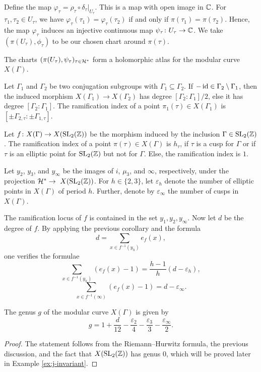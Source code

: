 Define the map $\varphi_\tau=\rho_\tau\circ\delta_\tau|_{U_\tau}$. This is a map with open image in $\mathbb{C}$. For $\tau_1,\tau_2\in U_\tau$, we have $\varphi_\tau(\tau_1)=\varphi_\tau(\tau_2)$ if and only if $\pi(\tau_1)=\pi(\tau_2)$. Hence, the map $\varphi_\tau$ induces an injective continuous map $\psi_\tau\colon U_\tau\to\mathbb{C}$. We take $(\pi(U_\tau),\phi_\tau)$ to be our chosen chart around $\pi(\tau)$.

\begin{prop}
 The charts $(\pi(U_\tau),\psi_\tau)_{\tau\in\mathcal{H}^*}$ form a holomorphic atlas for the modular curve $X(\Gamma)$.
\end{prop}

\begin{prop}
 Let $\Gamma_1$ and $\Gamma_2$ be two conjugation subgroups with $\Gamma_1\subseteq\Gamma_2$. If $-\operatorname{id}\in\Gamma_2\setminus\Gamma_1$, then the induced morphism $X(\Gamma_1)\to X(\Gamma_2)$ has degree $[\Gamma_2:\Gamma_1]/2$, else it has degree $[\Gamma_2:\Gamma_1]$. The ramification index of a point $\pi_1(\tau)\in X(\Gamma_1)$ is $[\pm\Gamma_{2,\tau}:\pm\Gamma_{1,\tau}]$.
\end{prop}

\begin{cor}
 Let $f\colon X(\Gamma)\to X(\operatorname{SL}_2(\mathbb{Z}))$ be the morphism induced by the inclusion $\Gamma\in\operatorname{SL}_2(\mathbb{Z})$. The ramification index of a point $\pi(\tau)\in X(\Gamma)$ is $h_\tau$, if $\tau$ is a cusp for $\Gamma$ or if $\tau$ is an elliptic point for $\operatorname{SL}_2(\mathbb{Z})$ but not for $\Gamma$. Else, the ramification index is $1$.
\end{cor}

Let $y_2$, $y_3$, and $y_\infty$ be the images of $i$, $\mu_3$, and $\infty$, respectively, under the projection $\mathcal{H}^*\to\ X(\operatorname{SL}_2(\mathbb{Z}))$. For $h\in\{2,3\}$, let $\varepsilon_h$ denote the number of elliptic points in $X(\Gamma)$ of period $h$. Further, denote by $\varepsilon_\infty$ the number of cusps in $X(\Gamma)$.

The ramification locus of $f$ is contained in the set ${y_1,y_2,y_\infty}$. Now let $d$ be the degree of $f$. By applying the previous corollary and the formula 
\[d=\sum_{x\in f^{-1}(y_h)}e_f(x),\] one verifies the formulae
\[\sum_{x\in f^{-1}(y_h)}(e_f(x)-1)=\frac{h-1}{h}(d-\varepsilon_h),\]
\[\sum_{x\in f^{-1}(\infty)}(e_f(x)-1)=d-\varepsilon_\infty.\]

\begin{prop}
 The genus $g$ of the modular curve $X(\Gamma)$ is given by
 \[g=1+\frac{d}{12}-\frac{\varepsilon_2}{4}-\frac{\varepsilon_3}{3}-\frac{\varepsilon_\infty}{2}.\]
\end{prop}

\begin{proof}
 The statement follows from the Riemann--Hurwitz formula, the previous discussion, and the fact that $X(\operatorname{SL}_2(\mathbb{Z}))$ has genus $0$, which will be proved later in Example \ref{ex:j-invariant}.
\end{proof}






